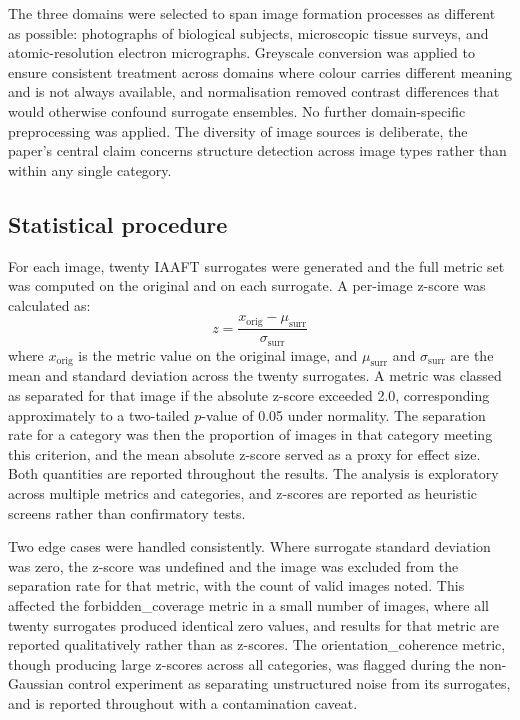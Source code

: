 \documentclass[a4paper,12pt]{article}
\begin{document}
The three domains were selected to span image formation processes as different as possible: photographs of biological subjects, microscopic tissue surveys, and atomic-resolution electron micrographs. Greyscale conversion was applied to ensure consistent treatment across domains where colour carries different meaning and is not always available, and normalisation removed contrast differences that would otherwise confound surrogate ensembles. No further domain-specific preprocessing was applied. The diversity of image sources is deliberate, the paper's central claim concerns structure detection across image types rather than within any single category.

\subsection{Statistical procedure}

For each image, twenty IAAFT surrogates were generated and the full metric set was computed on the original and on each surrogate. A per-image z-score was calculated as:
\begin{equation}
z = \frac{x_{\text{orig}} - \mu_{\text{surr}}}{\sigma_{\text{surr}}}
\end{equation}
where $x_{\text{orig}}$ is the metric value on the original image, and $\mu_{\text{surr}}$ and $\sigma_{\text{surr}}$ are the mean and standard deviation across the twenty surrogates. A metric was classed as separated for that image if the absolute z-score exceeded 2.0, corresponding approximately to a two-tailed $p$-value of 0.05 under normality. The separation rate for a category was then the proportion of images in that category meeting this criterion, and the mean absolute z-score served as a proxy for effect size. Both quantities are reported throughout the results. The analysis is exploratory across multiple metrics and categories, and z-scores are reported as heuristic screens rather than confirmatory tests.

Two edge cases were handled consistently. Where surrogate standard deviation was zero, the z-score was undefined and the image was excluded from the separation rate for that metric, with the count of valid images noted. This affected the forbidden\_coverage metric in a small number of images, where all twenty surrogates produced identical zero values, and results for that metric are reported qualitatively rather than as z-scores. The orientation\_coherence metric, though producing large z-scores across all categories, was flagged during the non-Gaussian control experiment as separating unstructured noise from its surrogates, and is reported throughout with a contamination caveat.
\end{document}
